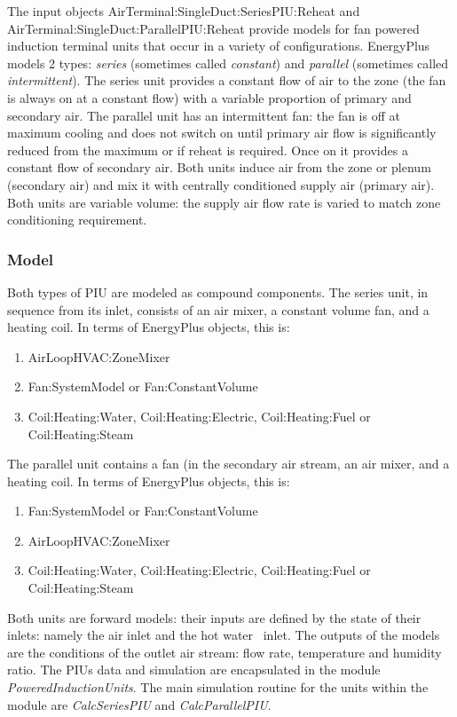 The input objects AirTerminal:SingleDuct:SeriesPIU:Reheat and \\ AirTerminal:SingleDuct:ParallelPIU:Reheat provide models for fan powered induction terminal units that occur in a variety of configurations. EnergyPlus models 2 types: \emph{series} (sometimes called \emph{constant}) and \emph{parallel} (sometimes called \emph{intermittent}). The series unit provides a constant flow of air to the zone (the fan is always on at a constant flow) with a variable proportion of primary and secondary air. The parallel unit has an intermittent fan: the fan is off at maximum cooling and does not switch on until primary air flow is significantly reduced from the maximum or if reheat is required. Once on it provides a constant flow of secondary air. Both units induce air from the zone or plenum (secondary air) and mix it with centrally conditioned supply air (primary air). Both units are variable volume: the supply air flow rate is varied to match zone conditioning requirement.

\subsubsection{Model}\label{model-1}

Both types of PIU are modeled as compound components. The series unit, in sequence from its inlet, consists of an air mixer, a constant volume fan, and a heating coil. In terms of EnergyPlus objects, this is:

\begin{enumerate}
\item AirLoopHVAC:ZoneMixer
\item Fan:SystemModel or Fan:ConstantVolume
\item Coil:Heating:Water, Coil:Heating:Electric, Coil:Heating:Fuel or Coil:Heating:Steam
\end{enumerate}

The parallel unit contains a fan (in the secondary air stream, an air mixer, and a heating coil. In terms of EnergyPlus objects, this is:

\begin{enumerate}
\item Fan:SystemModel or Fan:ConstantVolume
\item AirLoopHVAC:ZoneMixer
\item Coil:Heating:Water, Coil:Heating:Electric, Coil:Heating:Fuel or Coil:Heating:Steam
\end{enumerate}

Both units are forward models: their inputs are defined by the state of their inlets: namely the air inlet and the hot water~ inlet. The outputs of the models are the conditions of the outlet air stream: flow rate, temperature and humidity ratio. The PIUs data and simulation are encapsulated in the module \emph{PoweredInductionUnits}. The main simulation routine for the units within the module are \emph{CalcSeriesPIU} and \emph{CalcParallelPIU}.

